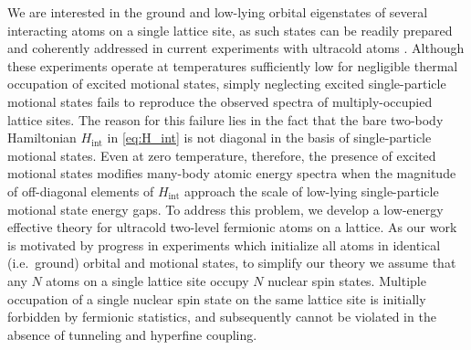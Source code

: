 \documentclass[preprint,showkeys,nofootinbib]{revtex4-1}
\renewcommand{\t}{\text} %
\newcommand{\1}{\mathds{1}}
\begin{document}
We are interested in the ground and low-lying orbital eigenstates of
several interacting atoms on a single lattice site, as such states can
be readily prepared and coherently addressed in current experiments
with ultracold atoms \cite{goban2018emergence}.  Although these
experiments operate at temperatures sufficiently low for negligible
thermal occupation of excited motional states, simply neglecting
excited single-particle motional states fails to reproduce the
observed spectra of multiply-occupied lattice sites.  The reason for
this failure lies in the fact that the bare two-body Hamiltonian
$H_{\t{int}}$ in \eqref{eq:H_int} is not diagonal in the basis of
single-particle motional states.  Even at zero temperature, therefore,
the presence of excited motional states modifies many-body atomic
energy spectra when the magnitude of off-diagonal elements of
$H_{\t{int}}$ approach the scale of low-lying single-particle motional
state energy gaps.  To address this problem, we develop a low-energy
effective theory for ultracold two-level fermionic atoms on a lattice.
As our work is motivated by progress in experiments which initialize
all atoms in identical (i.e.~ground) orbital and motional states, to
simplify our theory we assume that any $N$ atoms on a single lattice
site occupy $N$ nuclear spin states.  Multiple occupation of a single
nuclear spin state on the same lattice site is initially forbidden by
fermionic statistics, and subsequently cannot be violated in the
absence of tunneling and hyperfine coupling.
\end{document}
